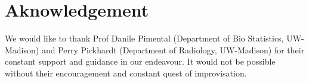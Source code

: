 \section{Aknowledgement}

We would like to thank Prof Danile Pimental (Department of Bio Statistics, UW-Madison) and Perry Pickhardt (Department of Radiology, UW-Madison) for their constant support and guidance in our endeavour. It would not be possible without their encouragement and constant quest of improvisation.